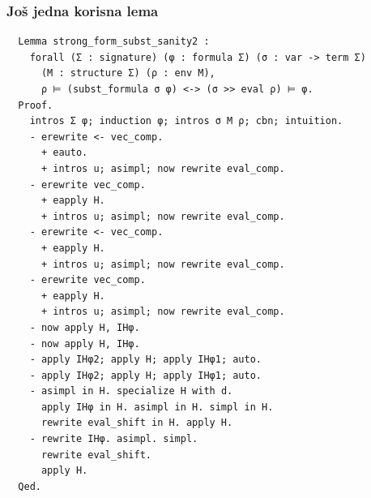 \documentclass{beamer}
\begin{document}
\begin{frame}[fragile]
  \frametitle{Još jedna korisna lema}
  \begin{tiny}
\begin{verbatim}
  Lemma strong_form_subst_sanity2 :
    forall (Σ : signature) (φ : formula Σ) (σ : var -> term Σ)
      (M : structure Σ) (ρ : env M),
      ρ ⊨ (subst_formula σ φ) <-> (σ >> eval ρ) ⊨ φ.
  Proof.
    intros Σ φ; induction φ; intros σ M ρ; cbn; intuition.
    - erewrite <- vec_comp.
      + eauto.
      + intros u; asimpl; now rewrite eval_comp.
    - erewrite vec_comp.
      + eapply H.
      + intros u; asimpl; now rewrite eval_comp.
    - erewrite <- vec_comp.
      + eapply H.
      + intros u; asimpl; now rewrite eval_comp.
    - erewrite vec_comp.
      + eapply H.
      + intros u; asimpl; now rewrite eval_comp.
    - now apply H, IHφ.
    - now apply H, IHφ. 
    - apply IHφ2; apply H; apply IHφ1; auto.
    - apply IHφ2; apply H; apply IHφ1; auto.
    - asimpl in H. specialize H with d.
      apply IHφ in H. asimpl in H. simpl in H.
      rewrite eval_shift in H. apply H.
    - rewrite IHφ. asimpl. simpl.
      rewrite eval_shift.
      apply H.
  Qed.
\end{verbatim}
  \end{tiny}
\end{frame}
\addtocounter{framenumber}{-1}
\end{document}
